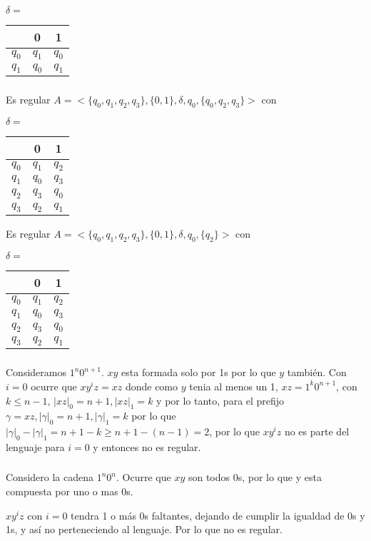 $\delta = $

\begin{tabular}{c | c | c}
		& 0		& 1 	\\
\hline
$q_0$	& $q_1$	& $q_0$ \\
$q_1$	& $q_0$	& $q_1$ \\
\end{tabular}

\subsubsection{}
Es regular $A = <\{q_0,q_1,q_2,q_3\}, \{0,1\}, \delta, q_0, \{q_0,q_2,q_3\}>$ con

$\delta = $

\begin{tabular}{c | c | c}
		& 0		& 1 	\\
\hline
$q_0$	& $q_1$	& $q_2$ \\
$q_1$	& $q_0$	& $q_3$ \\
$q_2$	& $q_3$	& $q_0$ \\
$q_3$	& $q_2$	& $q_1$ \\
\end{tabular}


Es regular $A = <\{q_0,q_1,q_2,q_3\}, \{0,1\}, \delta, q_0, \{q_2\}>$ con

$\delta = $

\begin{tabular}{c | c | c}
		& 0		& 1 	\\
\hline
$q_0$	& $q_1$	& $q_2$ \\
$q_1$	& $q_0$	& $q_3$ \\
$q_2$	& $q_3$	& $q_0$ \\
$q_3$	& $q_2$	& $q_1$ \\
\end{tabular}

\subsubsection{}
Consideramos $1^n0^{n+1}$. $xy$ esta formada solo por 1s por lo que $y$ también. Con $i = 0$ ocurre que $xy^iz = xz$ donde como $y$ tenia al menos un 1, $xz = 1^k0^{n+1}$, con $k \leq n - 1$, $|xz|_0 = n + 1, |xz|_1 = k$ y por lo tanto, para el prefijo $\gamma = xz, |\gamma|_0 = n + 1, |\gamma|_1 = k$ por lo que $|\gamma|_0 - |\gamma|_1 = n + 1 - k \geq n + 1 - (n - 1) = 2$, por lo que $xy^iz$ no es parte del lenguaje para $i = 0$ y entonces no es regular.

\subsubsection{}
Considero la cadena $1^n0^n$. Ocurre que $xy$ son todos 0s, por lo que y esta compuesta por uno o mas 0s. 

$xy^iz$ con $i=0$ tendra 1 o más 0s faltantes, dejando de cumplir la igualdad de 0s y 1s, y así no perteneciendo al lenguaje. Por lo que no es regular.